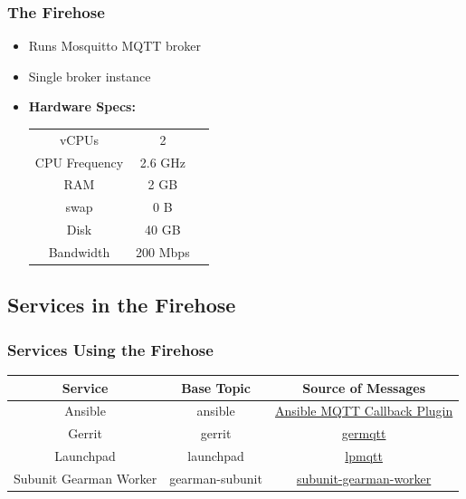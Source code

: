 \documentclass[aspectratio=169,11pt,hyperref={colorlinks=true}]{beamer}
\begin{document}
\begin{frame}
    \frametitle{The Firehose}
    \begin{itemize}
        \item Runs Mosquitto MQTT broker
        \item Single broker instance
        \item \textbf{Hardware Specs:}
        \begin{center}
            \begin{tabular}{ccc}
                \hline
                vCPUs & 2 \\
                CPU Frequency & 2.6 GHz \\
                RAM & 2 GB \\
                swap  & 0 B \\
                Disk & 40 GB \\
                Bandwidth & 200 Mbps \\
                \hline
            \end{tabular}
        \end{center}
    \end{itemize}
\end{frame}


\subsection{Services in the Firehose}
\begin{frame}
    \frametitle{Services Using the Firehose}
    \begin{center}
        \begin{tabular}{ccc}
            \hline
            \textbf{Service} & \textbf{Base Topic} & \textbf{Source of Messages}\\
            \hline
            Ansible & ansible & \href{http://git.openstack.org/cgit/openstack-infra/system-config/tree/modules/openstack_project/files/puppetmaster/mqtt.py}{Ansible MQTT Callback Plugin} \\
            Gerrit & gerrit & \href{http://git.openstack.org/cgit/openstack-infra/germqtt/}{germqtt} \\
            Launchpad & launchpad & \href{http://git.openstack.org/cgit/openstack-infra/lpmqtt/}{lpmqtt} \\
            Subunit Gearman Worker & gearman-subunit & \href{http://git.openstack.org/cgit/openstack-infra/puppet-subunit2sql/tree/files/subunit-gearman-worker.py}{subunit-gearman-worker} \\
        \end{tabular}
    \end{center}
\end{frame}
\end{document}
